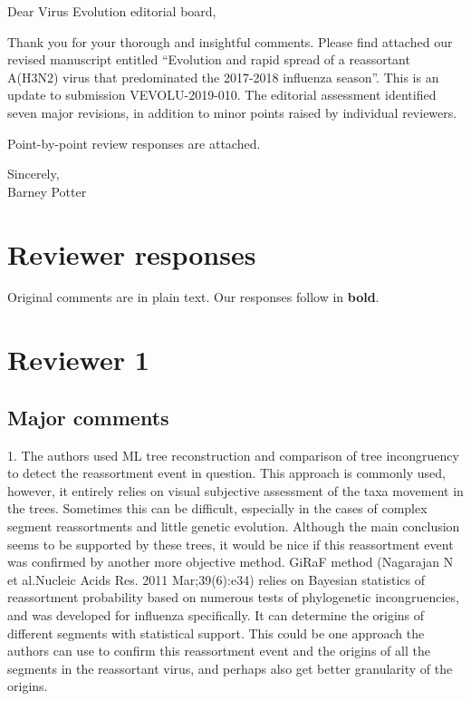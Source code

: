 \documentclass[11pt,oneside,letterpaper]{article}
\begin{document}

Dear Virus Evolution editorial board,

Thank you for your thorough and insightful comments. Please find attached our revised manuscript entitled ``Evolution and rapid spread of a reassortant A(H3N2) virus that predominated the 2017-2018 influenza season''.  This is an update to submission VEVOLU-2019-010. The editorial assessment identified seven major revisions, in addition to minor points raised by individual reviewers.

Point-by-point review responses are attached.

Sincerely,\\
Barney Potter

\newpage

\section*{Reviewer responses}

Original comments are in plain text.  Our responses follow in \textbf{bold}.

\section*{Reviewer 1}
\subsection*{Major comments}
1. The authors used ML tree reconstruction and comparison of tree incongruency to detect the reassortment event in question. This approach is commonly used, however, it entirely relies on visual subjective assessment of the taxa movement in the trees. Sometimes this can be difficult, especially in the cases of complex segment reassortments and little genetic evolution. Although the main conclusion seems to be supported by these trees, it would be nice if this reassortment event was confirmed by another more objective method. GiRaF method (Nagarajan N et al.Nucleic Acids Res. 2011 Mar;39(6):e34) relies on Bayesian statistics of reassortment probability based on numerous tests of phylogenetic incongruencies, and was developed for influenza specifically. It can determine the origins of different segments with statistical support. This could be one approach the authors can use to confirm this reassortment event and the origins of all the segments in the reassortant virus, and perhaps also get better granularity of the origins.\\
\end{document}
